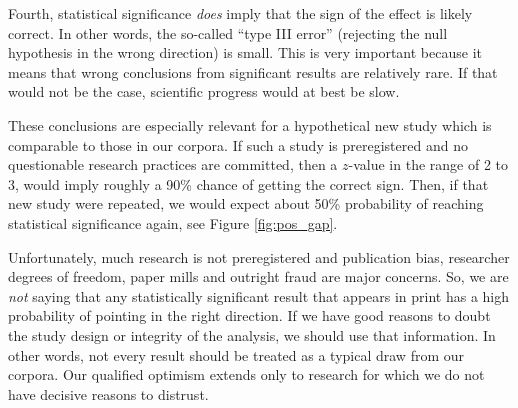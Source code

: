 \documentclass[11pt]{article}
\begin{document}
Fourth, statistical significance {\em does} imply that the sign of the effect is likely correct. In other words, the so-called ``type III error'' (rejecting the null hypothesis in the wrong direction) is small. This is very important because it means that wrong conclusions from significant results are relatively rare. If that would not be the case, scientific progress would at best be slow.

These conclusions are especially relevant for a hypothetical new study which is comparable to those in our corpora. If such a study is preregistered and no questionable research practices are committed, then a $z$-value in the range of 2 to 3, would imply roughly a 90\% chance of getting the correct sign. Then, if that new study were repeated, we would expect about 50\% probability of reaching statistical significance again, see Figure \ref{fig:pos_gap}. 

Unfortunately, much research is not preregistered and publication bias, researcher degrees of freedom, paper mills and outright fraud are major concerns. So, we are {\em not} saying that any statistically significant result that appears in print has a high probability of pointing in the right direction. If we have good reasons to doubt the study design or integrity of the analysis, we should use that information. In other words, not every result should be treated as a typical draw from our corpora. Our qualified optimism extends only to research for which we do not have decisive reasons to distrust.






\end{document}
